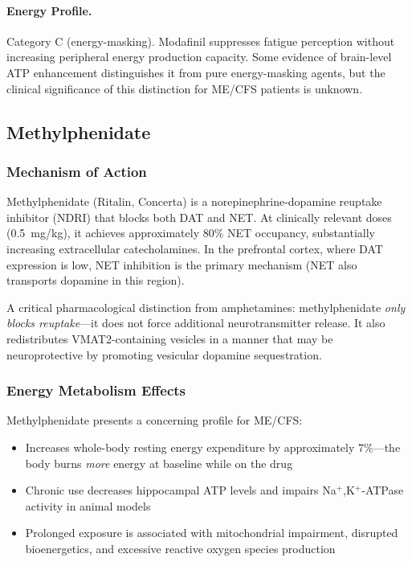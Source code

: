 \paragraph{Energy Profile.}
Category C (energy-masking). Modafinil suppresses fatigue perception without increasing peripheral energy production capacity. Some evidence of brain-level ATP enhancement distinguishes it from pure energy-masking agents, but the clinical significance of this distinction for ME/CFS patients is unknown.

\subsection{Methylphenidate}
\label{subsec:methylphenidate}

\subsubsection{Mechanism of Action}

Methylphenidate (Ritalin, Concerta) is a norepinephrine-dopamine reuptake inhibitor (NDRI) that blocks both DAT and NET. At clinically relevant doses (0.5~mg/kg), it achieves approximately 80\% NET occupancy, substantially increasing extracellular catecholamines. In the prefrontal cortex, where DAT expression is low, NET inhibition is the primary mechanism (NET also transports dopamine in this region).

A critical pharmacological distinction from amphetamines: methylphenidate \textit{only blocks reuptake}---it does not force additional neurotransmitter release. It also redistributes VMAT2-containing vesicles in a manner that may be neuroprotective by promoting vesicular dopamine sequestration.

\subsubsection{Energy Metabolism Effects}

Methylphenidate presents a concerning profile for ME/CFS:
\begin{itemize}
    \item Increases whole-body resting energy expenditure by approximately 7\%---the body burns \textit{more} energy at baseline while on the drug~\cite{Leddy2012methylphenidateREE}
    \item Chronic use decreases hippocampal ATP levels and impairs Na$^+$,K$^+$-ATPase activity in animal models~\cite{Graveling2023stimulantmitochondria}
    \item Prolonged exposure is associated with mitochondrial impairment, disrupted bioenergetics, and excessive reactive oxygen species production
\end{itemize}

